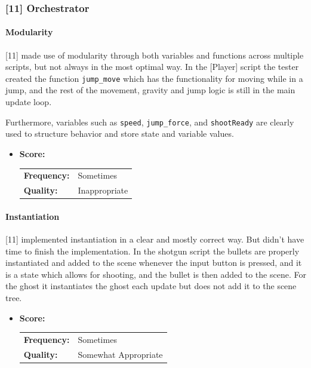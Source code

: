 \subsubsection{[11] Orchestrator}

\paragraph{Modularity}

[11] made use of modularity through both variables and functions across multiple scripts, but not always in the most optimal way.
In the [Player] script the tester created the function \texttt{jump\_move} which has the functionality for moving while in a jump, and the rest of the movement, gravity and jump logic is still in the main update loop.

Furthermore, variables such as \texttt{speed}, \texttt{jump\_force}, and \texttt{shootReady} are clearly used to structure behavior and store state and variable values.

\begin{itemize}
	\item \textbf{Score:}
	      \begin{tabular}{ll}
		      \textbf{Frequency:} & Sometimes     \\
		      \textbf{Quality:}   & Inappropriate \\
	      \end{tabular}
\end{itemize}

\paragraph{Instantiation}

[11] implemented instantiation in a clear and mostly correct way.
But didn't have time to finish the implementation.
In the shotgun script the bullets are properly instantiated and added to the scene whenever the input button is pressed, and it is a state which allows for shooting, and the bullet is then added to the scene.
For the ghost it instantiates the ghost each update but does not add it to the scene tree.

\begin{itemize}
	\item \textbf{Score:}
	      \begin{tabular}{ll}
		      \textbf{Frequency:} & Sometimes            \\
		      \textbf{Quality:}   & Somewhat Appropriate \\
	      \end{tabular}
\end{itemize}

